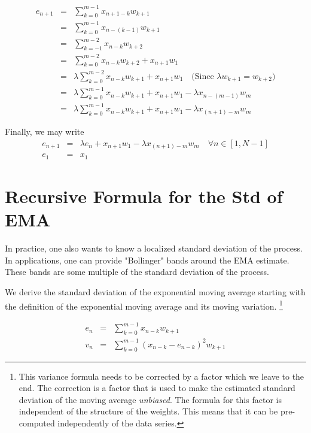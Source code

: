 \documentclass{article}
\begin{document}
\begin{eqnarray*}
e_{n+1} & = & \sum_{k=0}^{m-1} x_{n+1-k} w_{k+1} \\
        & = & \sum_{k=0}^{m-1} x_{n-(k-1)} w_{k+1} \\
        & = & \sum_{k=-1}^{m-2} x_{n-k} w_{k+2}  \\
        & = & \sum_{k=0}^{m-2} x_{n-k} w_{k+2}  + x_{n+1} w_1 \\
        & = & \lambda \sum_{k=0}^{m-2} x_{n-k} w_{k+1}  + x_{n+1} w_1  \quad \text{(Since $\lambda w_{k+1} = w_{k+2}$)} \\
        & = & \lambda \sum_{k=0}^{m-1} x_{n-k} w_{k+1}  + x_{n+1} w_1  
                - \lambda x_{n-(m-1)} w_m  \\
        & = & \lambda \sum_{k=0}^{m-1} x_{n-k} w_{k+1}  + x_{n+1} w_1  
                - \lambda x_{(n+1)-m} w_m 
\end{eqnarray*}

Finally, we may write
\begin{eqnarray}
    e_{n+1} & = & \lambda e_n + x_{n+1} w_1 - \lambda x_{(n+1)-m} w_m \quad \forall n \in [1, N-1] \\
e_1     & = & x_1
\end{eqnarray}

\section{Recursive Formula for the Std of EMA}
In practice, one also wants to know a localized standard deviation of the process.
In applications, one can provide "Bollinger" bands around the EMA estimate.
These bands are some multiple of the standard deviation of the process.

We derive the standard deviation of the exponential moving average starting
with the definition of the exponential moving average and its moving variation.%
\footnote{This variance formula needs to be corrected by a factor which we 
leave to the end. The correction is a factor that is used to make the 
estimated standard deviation of the moving average {\em unbiased\/}.
The formula for this factor is independent of the structure of the weights.
This means that it can be pre-computed independently of the data series.}

\begin{eqnarray}
e_n & = & \sum_{k=0}^{m-1} x_{n-k} w_{k+1} \\
v_n & = & \sum_{k=0}^{m-1} (x_{n-k} - e_{n-k})^2  w_{k+1}
\end{eqnarray}
\end{document}
